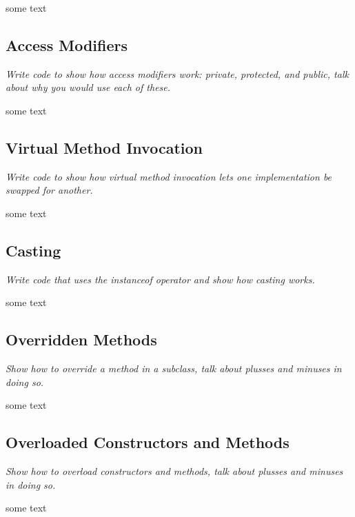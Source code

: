 some text


\subsection{Access Modifiers}
\textit{Write code to show how access modifiers work: private, protected, and public, talk about why you would use each of these.}

some text



\subsection{Virtual Method Invocation}
\textit{Write code to show how virtual method invocation lets one implementation be swapped for another.}

some text


\subsection{Casting}
\textit{Write code that uses the instanceof operator and show how casting works.}

some text


\subsection{Overridden Methods}
\textit{Show how to override a method in a subclass, talk about plusses and minuses in doing so.}

some text

\subsection{Overloaded Constructors and Methods}
\textit{Show how to overload constructors and methods, talk about plusses and minuses in doing so.}

some text
